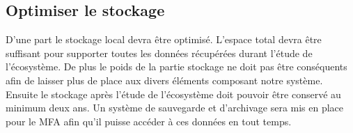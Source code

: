 

\subsection{Optimiser le stockage}
\label{s:beo_obj_stockage}

D’une part le stockage local devra être optimisé. L’espace total devra être suffisant pour supporter toutes les données récupérées durant l’étude de l’écosystème. De plus le poids de la partie stockage ne doit pas être conséquents afin de laisser plus de place aux divers éléments composant notre système.
Ensuite le stockage après l’étude de l’écosystème doit pouvoir être conservé au minimum deux ans. Un système de sauvegarde et d’archivage sera mis en place pour le MFA afin qu’il puisse accéder à ces données en tout temps.
